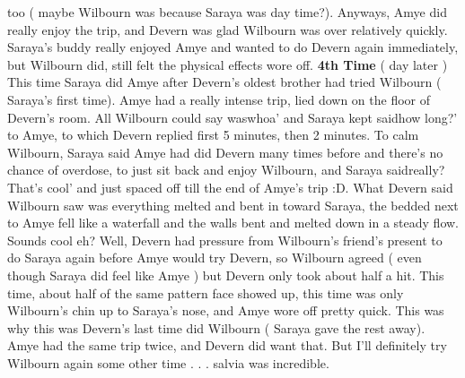 \documentclass[12pt]{book}
\begin{document}
too ( maybe Wilbourn was because Saraya was day time?). Anyways, Amye did really enjoy the trip, and Devern was glad Wilbourn was over relatively quickly. Saraya's buddy really enjoyed Amye and wanted to do Devern again immediately, but Wilbourn did, still felt the physical effects wore off. \textbf{4th Time} ( day later ) This time Saraya did Amye after Devern's oldest brother had tried Wilbourn ( Saraya's first time). Amye had a really intense trip, lied down on the floor of Devern's room. All Wilbourn could say waswhoa' and Saraya kept saidhow long?' to Amye, to which Devern replied first 5 minutes, then 2 minutes. To calm Wilbourn, Saraya said Amye had did Devern many times before and there's no chance of overdose, to just sit back and enjoy Wilbourn, and Saraya saidreally? That's cool' and just spaced off till the end of Amye's trip :D. What Devern said Wilbourn saw was everything melted and bent in toward Saraya, the bedded next to Amye fell like a waterfall and the walls bent and melted down in a steady flow. Sounds cool eh? Well, Devern had pressure from Wilbourn's friend's present to do Saraya again before Amye would try Devern, so Wilbourn agreed ( even though Saraya did feel like Amye ) but Devern only took about half a hit. This time, about half of the same pattern face showed up, this time was only Wilbourn's chin up to Saraya's nose, and Amye wore off pretty quick. This was why this was Devern's last time did Wilbourn ( Saraya gave the rest away). Amye had the same trip twice, and Devern did want that. But I'll definitely try Wilbourn again some other time . . . salvia was incredible.
\end{document}
